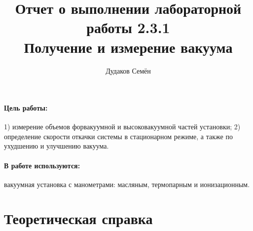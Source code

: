 \documentclass[12pt,a4paper]{article}
\title{
Отчет о выполнении лабораторной работы 2.3.1 \\
Получение и измерение вакуума
}
\author{Дудаков Семён}
\begin{document}
\maketitle

\paragraph{Цель работы:} 1) измерение объемов форвакуумной и высоковакуумной частей установки; 2) определение скорости откачки системы в стационарном режиме, а также по ухудшению и улучшению вакуума.
\paragraph{В работе используются:} вакуумная установка с манометрами: масляным, термопарным и ионизационным.

\section{Теоретическая справка}
\end{document}
